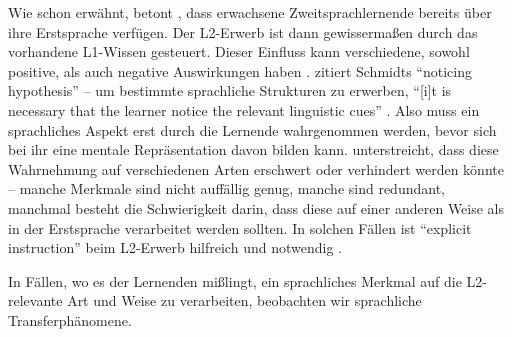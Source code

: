 Wie schon erwähnt, betont \cite{Ellis08}, dass erwachsene Zweitsprachlernende bereits über ihre Erstsprache verfügen.
Der L2-Erwerb ist dann gewissermaßen durch das vorhandene L1-Wissen gesteuert.
Dieser Einfluss kann verschiedene, sowohl positive, als auch negative Auswirkungen haben \cite{Ellis08}.
\cite{Ellis04} zitiert Schmidts ``noticing hypothesis'' -- um bestimmte sprachliche Strukturen zu erwerben, ``[i]t is necessary that the learner notice the relevant linguistic cues'' \cite{Schmidt90}.
Also muss ein sprachliches Aspekt erst durch die Lernende wahrgenommen werden, bevor sich bei ihr eine mentale Repräsentation davon bilden kann.
\cite{Ellis04} unterstreicht, dass diese Wahrnehmung auf verschiedenen Arten erschwert oder verhindert werden könnte --
manche Merkmale sind nicht auffällig genug,
manche sind redundant,
manchmal besteht die Schwierigkeit darin, dass diese auf einer anderen Weise als in der Erstsprache verarbeitet werden sollten.
In solchen Fällen ist ``explicit instruction'' beim L2-Erwerb hilfreich und notwendig \cite{Ellis04}.

In Fällen, wo es der Lernenden mißlingt, ein sprachliches Merkmal auf die L2-relevante Art und Weise zu verarbeiten, beobachten wir sprachliche Transferphänomene.








